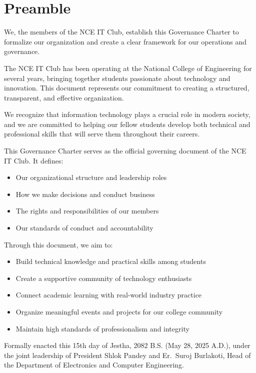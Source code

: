 {}
\section*{Preamble}

We, the members of the NCE IT Club, establish this Governance Charter to formalize our organization and create a clear framework for our operations and governance.

The NCE IT Club has been operating at the National College of Engineering for several years, bringing together students passionate about technology and innovation. This document represents our commitment to creating a structured, transparent, and effective organization.

We recognize that information technology plays a crucial role in modern society, and we are committed to helping our fellow students develop both technical and professional skills that will serve them throughout their careers.

This Governance Charter serves as the official governing document of the NCE IT Club. It defines:
\begin{itemize}[leftmargin=2em, itemsep=0.3em]
    \item Our organizational structure and leadership roles
    \item How we make decisions and conduct business
    \item The rights and responsibilities of our members
    \item Our standards of conduct and accountability
\end{itemize}

Through this document, we aim to:
\begin{itemize}[leftmargin=2em, itemsep=0.3em]
    \item Build technical knowledge and practical skills among students
    \item Create a supportive community of technology enthusiasts
    \item Connect academic learning with real-world industry practice
    \item Organize meaningful events and projects for our college community
    \item Maintain high standards of professionalism and integrity
\end{itemize}

Formally enacted this 15th day of Jestha, 2082 B.S. (May 28, 2025 A.D.), under the joint leadership of President Shlok Pandey and Er.~Suroj Burlakoti, Head of the Department of Electronics and Computer Engineering.
